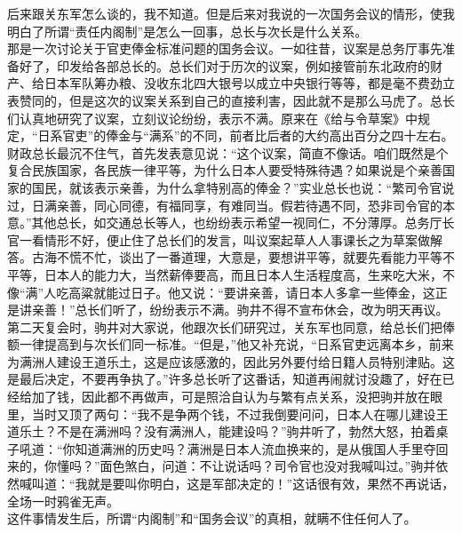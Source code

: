 后来跟关东军怎么谈的，我不知道。但是后来对我说的一次国务会议的情形，使我明白了所谓“责任内阁制”是怎么一回事，总长与次长是什么关系。\\

那是一次讨论关于官吏俸金标准问题的国务会议。一如往昔，议案是总务厅事先准备好了，印发给各部总长的。总长们对于历次的议案，例如接管前东北政府的财产、给日本军队筹办粮、没收东北四大银号以成立中央银行等等，都是毫不费劲立表赞同的，但是这次的议案关系到自己的直接利害，因此就不是那么马虎了。总长们认真地研究了议案，立刻议论纷纷，表示不满。原来在《给与令草案》中规定，“日系官吏”的俸金与“满系”的不同，前者比后者的大约高出百分之四十左右。财政总长最沉不住气，首先发表意见说：“这个议案，简直不像话。咱们既然是个复合民族国家，各民族一律平等，为什么日本人要受特殊待遇？如果说是个亲善国家的国民，就该表示亲善，为什么拿特别高的俸金？”实业总长也说：“繁司令官说过，日满亲善，同心同德，有福同享，有难同当。假若待遇不同，恐非司令官的本意。”其他总长，如交通总长等人，也纷纷表示希望一视同仁，不分薄厚。总务厅长官一看情形不好，便止住了总长们的发言，叫议案起草人人事课长之为草案做解答。古海不慌不忙，谈出了一番道理，大意是，要想讲平等，就要先看能力平等不平等，日本人的能力大，当然薪俸要高，而且日本人生活程度高，生来吃大米，不像“满”人吃高粱就能过日子。他又说：“要讲亲善，请日本人多拿一些俸金，这正是讲亲善！”总长们听了，纷纷表示不满。驹井不得不宣布休会，改为明天再议。\\

第二天复会时，驹井对大家说，他跟次长们研究过，关东军也同意，给总长们把俸额一律提高到与次长们同一标准。“但是，”他又补充说，“日系官吏远离本乡，前来为满洲人建设王道乐土，这是应该感激的，因此另外要付给日籍人员特别津贴。这是最后决定，不要再争执了。”许多总长听了这番话，知道再闹就讨没趣了，好在已经给加了钱，因此都不再做声，可是照洽自认为与繁有点关系，没把驹并放在眼里，当时又顶了两句：“我不是争两个钱，不过我倒要问问，日本人在哪儿建设王道乐土？不是在满洲吗？没有满洲人，能建设吗？”驹井听了，勃然大怒，拍着桌子吼道：“你知道满洲的历史吗？满洲是日本人流血换来的，是从俄国人手里夺回来的，你懂吗？”面色煞白，问道：不让说话吗？司令官也没对我喊叫过。”驹并依然喊叫道：“我就是要叫你明白，这是军部决定的！”这话很有效，果然不再说话，全场一时鸦雀无声。\\

这件事情发生后，所谓“内阁制”和“国务会议”的真相，就瞒不住任何人了。\\

